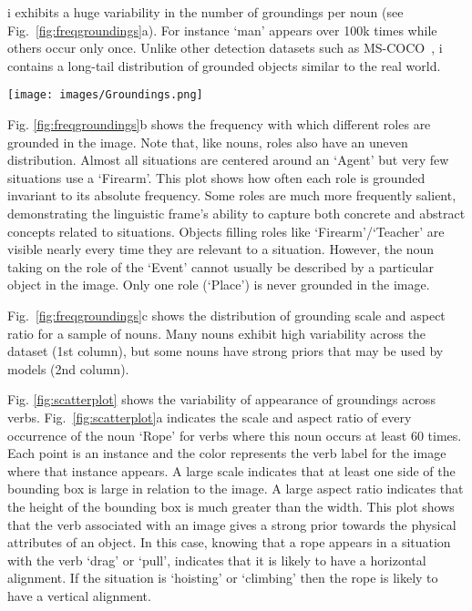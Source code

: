 \documentclass[runningheads]{llncs}
\newcommand{\dataset}{\mbox{\sc{SW}}i\mbox{\sc{G}}\xspace}
\begin{document}
\dataset{} exhibits a huge variability in the number of groundings per noun (see Fig.~\ref{fig:freqgroundings}a). For instance `man' appears over 100k times while others occur only once. Unlike other detection datasets such as MS-COCO~\cite{chen2015microsoft}, \dataset{} contains a long-tail distribution of grounded objects similar to the real world.  

\vspace{-6mm}
\begin{figure*}[h!]
\begin{center}
\texttt{[image: images/Groundings.png]}
\end{center}
\vspace{-7mm}
\caption{\textbf{Dataset visualizations.} (A) Number of groundings per noun. Note the log scale and the fact that this only shows a small sample. (B) Frequency with which different roles are grounded in the image. (C) Distribution of grounding scale (y-axis) and aspect ratio (x-axis) conditioned on some nouns}
\label{fig:freqgroundings}
\vspace{-5mm}
\end{figure*}

Fig. \ref{fig:freqgroundings}b shows the frequency with which different roles are grounded in the image. Note that, like nouns, roles also have an uneven distribution. Almost all situations are centered around an `Agent' but very few situations use a `Firearm'. This plot shows how often each role is grounded invariant to its absolute frequency. Some roles are much more frequently salient, demonstrating the linguistic frame's ability to capture both concrete and abstract concepts related to situations. Objects filling roles like `Firearm'/`Teacher' are visible nearly every time they are relevant to a situation. However, the noun taking on the role of the `Event' cannot usually be described by a particular object in the image. Only one role (`Place') is never grounded in the image.

Fig.~\ref{fig:freqgroundings}c shows the distribution of grounding scale and aspect ratio for a sample of nouns. Many nouns exhibit high variability across the dataset (1st column), but some nouns have strong priors that may be used by models (2nd column).

Fig. \ref{fig:scatterplot} shows the variability of appearance of groundings across verbs. Fig.~\ref{fig:scatterplot}a indicates the scale and aspect ratio of every occurrence of the noun `Rope' for verbs where this noun occurs at least 60 times. Each point is an instance and the color represents the verb label for the image where that instance appears. A large scale indicates that at least one side of the bounding box is large in relation to the image. A large aspect ratio indicates that the height of the bounding box is much greater than the width. This plot shows that the verb associated with an image gives a strong prior towards the physical attributes of an object. In this case, knowing that a rope appears in a situation with the verb `drag' or `pull', indicates that it is likely to have a horizontal alignment. If the situation is `hoisting' or `climbing' then the rope is likely to have a vertical alignment. 
\end{document}
